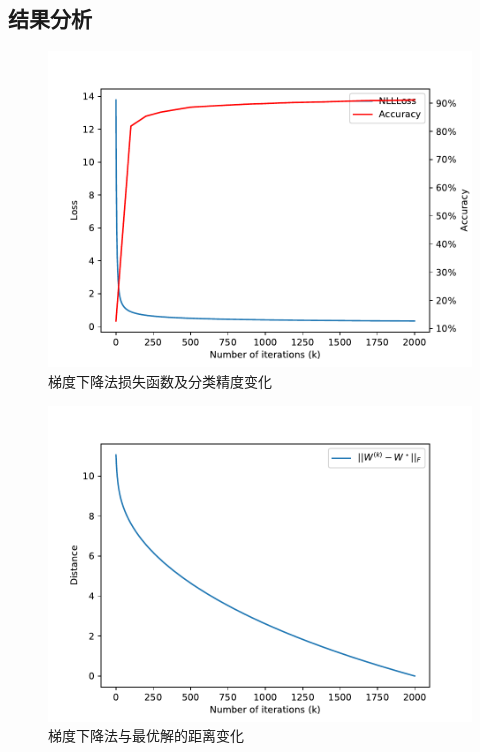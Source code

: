 \documentclass[logo,reportComp]{thesis}
\begin{document}
\subsection{结果分析}
\begin{minipage}{0.5\linewidth}
\begin{figure}[H]
\centering
\includegraphics[width=\linewidth]{fig/p2-acc.pdf}
\caption{梯度下降法损失函数及分类精度变化}
\label{fig:p2-acc-gd}
\end{figure}
\end{minipage}
\begin{minipage}{0.5\linewidth}
\begin{figure}[H]
\centering
\includegraphics[width=\linewidth]{fig/p2-opt-dist.pdf}
\caption{梯度下降法与最优解的距离变化}
\label{fig:p2-opt-dist-gd}
\end{figure}
\end{minipage}
\end{document}
